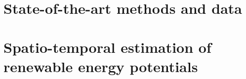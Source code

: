 %
%
%






\setlength{\parindent}{0pt}
\setlength{\parskip}{0pt} %
\setlength{\textfloatsep}{10pt plus 1.0pt minus 2.0pt}
\renewcommand{\arraystretch}{1.2} %
\setlength{\tabcolsep}{3pt} %
\frontmatter

% 
\setcounter{page}{0}
% 
% 
% 

\cleardoublepage
{}
\tableofcontents

\cleardoublepage
{}
{} %
\listoffigures
% 
\cleardoublepage
{}
{} %
\listoftables

\cleardoublepage
{}
{} %


\setlength{\parskip}{1em}


\nobibliography*
\mainmatter

\cleardoublepage

\part{State-of-the-art methods and data}
\label{methods}

\cleardoublepage

\cleardoublepage

\cleardoublepage

\part{Spatio-temporal estimation of renewable energy potentials}
\label{potential}

\cleardoublepage

\cleardoublepage

